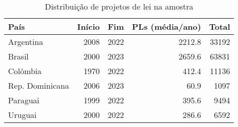 \begin{table}[!h]

\caption{\label{tab:pls}Distribuição de projetos de lei na amostra}
\centering
\begin{tabular}[t]{lrrrr}
\toprule
País & Início & Fim & PLs (média/ano) & Total\\
\midrule
Argentina & 2008 & 2022 & 2212.8 & 33192\\
Brasil & 2000 & 2023 & 2659.6 & 63831\\
Colômbia & 1970 & 2022 & 412.4 & 11136\\
Rep. Dominicana & 2006 & 2023 & 60.9 & 1097\\
Paraguai & 1999 & 2022 & 395.6 & 9494\\
Uruguai & 2000 & 2022 & 286.6 & 6592\\
\bottomrule
\end{tabular}
\end{table}
